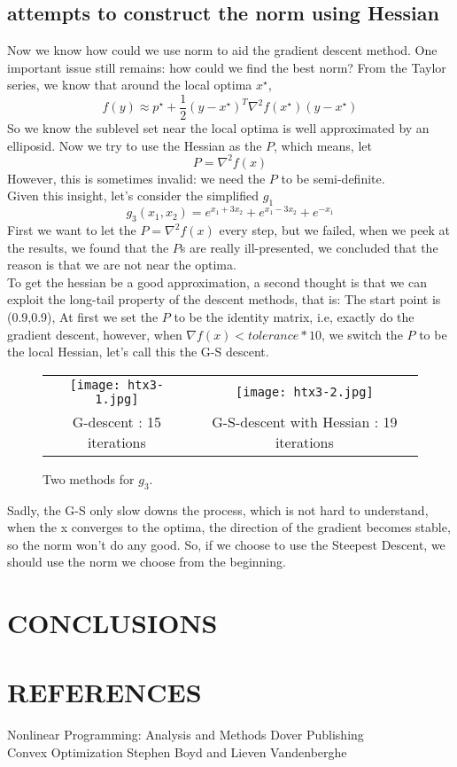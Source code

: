 \documentclass{article}
\begin{document}
\subsection{attempts to construct the norm using Hessian}
Now we know how could we use norm to aid the gradient descent method. One important issue still remains: how could we find the best norm? From the Taylor series, we know that around the local optima $x^{\star}$,
\begin{displaymath}
f(y) \approx p^{\star} + \frac{1}{2} (y - x^\star)^T\nabla^2f(x^\star)(y-x^\star)
\end{displaymath}
So we know the sublevel set near the local optima is well approximated by an elliposid. Now we try to use the Hessian as the $P$, which means, let
\begin{displaymath}
P = \nabla^2f(x)
\end{displaymath}
However, this is sometimes invalid: we need the $P$ to be semi-definite.\\
Given this insight, let's consider the simplified $g_1$
\begin{displaymath}
g_3(x_1, x_2) = e ^ {x_1 + 3x_2} + e ^ {x_1-3x_2} + e^{-x_1}
\end{displaymath}
First we want to let the $P = \nabla^2f(x)$ every step, but we failed, when we peek at the results, we found that the $P$s are really ill-presented, we concluded that the reason is that we are not near the optima.\\
To get the hessian be a good approximation, a second thought is that we can exploit the long-tail property of the descent methods, that is: The start point is (0.9,0.9), At first we set the $P$ to be the identity matrix, i.e, exactly do the gradient descent, however, when $\nabla f(x) < tolerance * 10$, we switch the $P$ to be the local Hessian, let's call this the G-S descent.
\begin{figure}
        \begin{tabular}{cc}
            \texttt{[image: htx3-1.jpg]} &
            \texttt{[image: htx3-2.jpg]} \\
            G-descent : 15 iterations&
            G-S-descent with Hessian : 19 iterations \\
        \end{tabular}
    \caption{\label{fig:htx3}Two methods for $g_3$.}
\end{figure}
Sadly, the G-S only slow downs the process, which is not hard to understand, when the x converges to the optima, the direction of the gradient becomes stable, so the norm won't do any good. So, if we choose to use the Steepest Descent, we should use the norm we choose from the beginning.
\section{CONCLUSIONS}


\section{REFERENCES}
Nonlinear Programming: Analysis and Methods Dover Publishing\\
Convex Optimization Stephen Boyd and Lieven Vandenberghe\\
\balancecolumns
\end{document}
